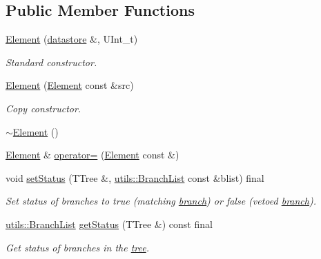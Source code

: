 \subsection*{Public Member Functions}
\begin{DoxyCompactItemize}
\item 
\hyperlink{classpanda_1_1Element_a3609b8601b13eab58a55ca795ee0d6a9}{Element} (\hyperlink{structpanda_1_1Element_1_1datastore}{datastore} \&, UInt\_\-t)
\begin{DoxyCompactList}\small\item\em Standard constructor. \item\end{DoxyCompactList}\item 
\hyperlink{classpanda_1_1Element_a05d5ba2bfa48de80d981542bfec8ce53}{Element} (\hyperlink{classpanda_1_1Element}{Element} const \&src)
\begin{DoxyCompactList}\small\item\em Copy constructor. \item\end{DoxyCompactList}\item 
\hyperlink{classpanda_1_1Element_aa2ba932e80290d7449e03f6345960631}{$\sim$Element} ()
\item 
\hyperlink{classpanda_1_1Element}{Element} \& \hyperlink{classpanda_1_1Element_aab6953bcc5df661a05d49fca81a0a4fc}{operator=} (\hyperlink{classpanda_1_1Element}{Element} const \&)
\item 
void \hyperlink{classpanda_1_1Element_a86dead86ad366a92531c3e7f1f157994}{setStatus} (TTree \&, \hyperlink{classpanda_1_1utils_1_1BranchList}{utils::BranchList} const \&blist) final
\begin{DoxyCompactList}\small\item\em Set status of branches to true (matching \hyperlink{namespacepanda_1_1branch}{branch}) or false (vetoed \hyperlink{namespacepanda_1_1branch}{branch}). \item\end{DoxyCompactList}\item 
\hyperlink{classpanda_1_1utils_1_1BranchList}{utils::BranchList} \hyperlink{classpanda_1_1Element_acab0938ba6e630b042052a960b58546e}{getStatus} (TTree \&) const final
\begin{DoxyCompactList}\small\item\em Get status of branches in the \hyperlink{namespacepanda_1_1tree}{tree}. \item\end{DoxyCompactList}\item 

\end{DoxyCompactItemize}
